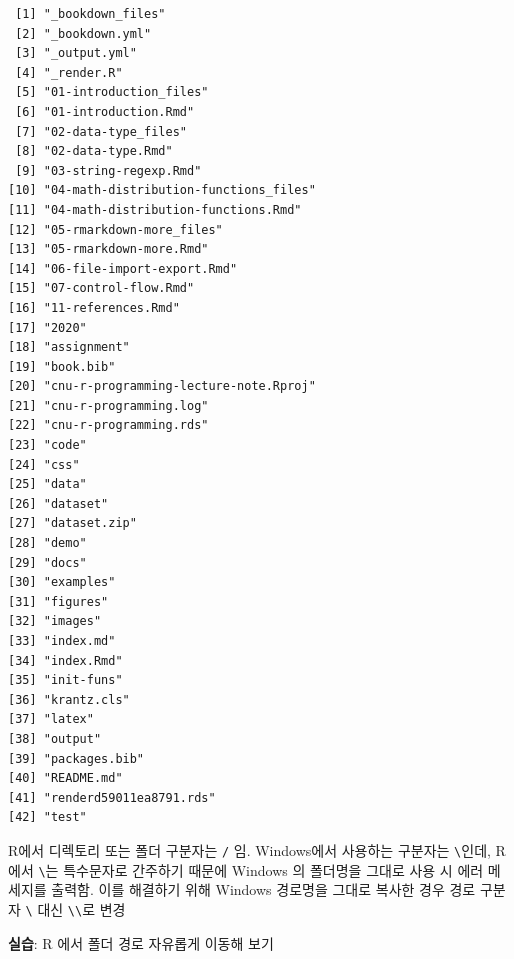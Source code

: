 \documentclass[
  11pt,
]{krantz}
\makeatletter
\newenvironment{kframe}{%
\medskip{}
\setlength{\fboxsep}{.8em}
 \def\at@end@of@kframe{}%
 \ifinner\ifhmode%
  \def\at@end@of@kframe{\end{minipage}}%
  \begin{minipage}{\columnwidth}%
 \fi\fi%
 \def\FrameCommand##1{\hskip\@totalleftmargin \hskip-\fboxsep
 \colorbox{shadecolor}{##1}\hskip-\fboxsep
     \hskip-\linewidth \hskip-\@totalleftmargin \hskip\columnwidth}%
 \MakeFramed {\advance\hsize-\width
   \@totalleftmargin\z@ \linewidth\hsize
   \@setminipage}}%
 {\par\unskip\endMakeFramed%
 \at@end@of@kframe}
\newenvironment{rmdblock}[1]
  {
  \begin{itemize}
  \renewcommand{\labelitemi}{
    \raisebox{-.7\height}[0pt][0pt]{
      {\setkeys{Gin}{width=3em,keepaspectratio}\texttt{[image: images/\#1]}}
    }
  }
  \setlength{\fboxsep}{1em}
  \begin{kframe}
  \item
  }
  {
  \end{kframe}
  \end{itemize}
  }
\newenvironment{rmdcaution}
  {\begin{rmdblock}{caution}}
  {\end{rmdblock}}
\makeatother
\begin{document}
\begin{verbatim}
 [1] "_bookdown_files"                     
 [2] "_bookdown.yml"                       
 [3] "_output.yml"                         
 [4] "_render.R"                           
 [5] "01-introduction_files"               
 [6] "01-introduction.Rmd"                 
 [7] "02-data-type_files"                  
 [8] "02-data-type.Rmd"                    
 [9] "03-string-regexp.Rmd"                
[10] "04-math-distribution-functions_files"
[11] "04-math-distribution-functions.Rmd"  
[12] "05-rmarkdown-more_files"             
[13] "05-rmarkdown-more.Rmd"               
[14] "06-file-import-export.Rmd"           
[15] "07-control-flow.Rmd"                 
[16] "11-references.Rmd"                   
[17] "2020"                                
[18] "assignment"                          
[19] "book.bib"                            
[20] "cnu-r-programming-lecture-note.Rproj"
[21] "cnu-r-programming.log"               
[22] "cnu-r-programming.rds"               
[23] "code"                                
[24] "css"                                 
[25] "data"                                
[26] "dataset"                             
[27] "dataset.zip"                         
[28] "demo"                                
[29] "docs"                                
[30] "examples"                            
[31] "figures"                             
[32] "images"                              
[33] "index.md"                            
[34] "index.Rmd"                           
[35] "init-funs"                           
[36] "krantz.cls"                          
[37] "latex"                               
[38] "output"                              
[39] "packages.bib"                        
[40] "README.md"                           
[41] "renderd59011ea8791.rds"              
[42] "test"                                
\end{verbatim}

\normalsize

\footnotesize

\begin{rmdcaution}
R에서 디렉토리 또는 폴더 구분자는 \texttt{/} 임. Windows에서 사용하는 구분자는 \texttt{\textbackslash{}}인데, R에서 \texttt{\textbackslash{}}는 특수문자로 간주하기 때문에 Windows 의 폴더명을 그대로 사용 시 에러 메세지를 출력함. 이를 해결하기 위해 Windows 경로명을 그대로 복사한 경우 경로 구분자 \texttt{\textbackslash{}} 대신 \texttt{\textbackslash{}\textbackslash{}}로 변경

\textbf{실습}: R 에서 폴더 경로 자유롭게 이동해 보기
\end{rmdcaution}
\end{document}
